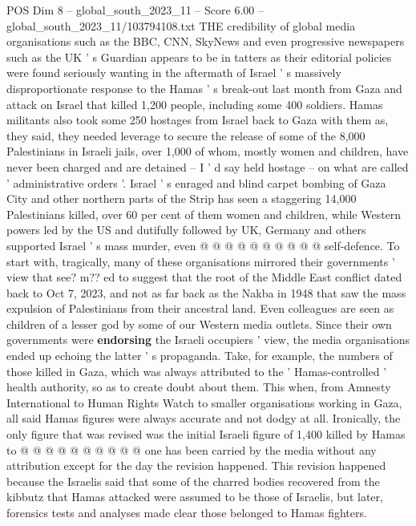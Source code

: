 \begin{textsample}{POS Dim 8 – global\_south\_2023\_11 – Score 6.00 – global\_south\_2023\_11/103794108.txt}  \label{ex:f8_pos_278}
THE credibility of global media organisations such as the BBC, CNN, SkyNews and even progressive newspapers such as the UK ' s Guardian appears to be in tatters as their editorial policies were found seriously wanting in the aftermath of Israel ' s massively disproportionate response to the Hamas ' s break-out last month from Gaza and attack on Israel that killed 1,200 people, including some 400 soldiers.
Hamas militants also took some 250 hostages from Israel back to Gaza with them as, they said, they needed leverage to secure the release of some of the 8,000 Palestinians in Israeli jails, over 1,000 of whom, mostly women and children, have never been charged and are detained -- I ' d say held hostage -- on what are called ' administrative orders '.
Israel ' s enraged and blind carpet bombing of Gaza City and other northern parts of the Strip has seen a staggering 14,000 Palestinians killed, over 60 per cent of them women and children, while Western powers led by the US and dutifully followed by UK, Germany and others supported Israel ' s mass murder, even @ @ @ @ @ @ @ @ @ @ self-defence.
To start with, tragically, many of these organisations mirrored their governments ' view that see? m?? ed to suggest that the root of the Middle East conflict dated back to Oct 7, 2023, and not as far back as the Nakba in 1948 that saw the mass expulsion of Palestinians from their ancestral land.
Even colleagues are seen as children of a lesser god by some of our Western media outlets.
Since their own governments were \textbf{endorsing} the Israeli occupiers ' view, the media organisations ended up echoing the latter ' s propaganda.
Take, for example, the numbers of those killed in Gaza, which was always attributed to the ' Hamas-controlled ' health authority, so as to create doubt about them.
This when, from Amnesty International to Human Rights Watch to smaller organisations working in Gaza, all said Hamas figures were always accurate and not dodgy at all.
Ironically, the only figure that was revised was the initial Israeli figure of 1,400 killed by Hamas to @ @ @ @ @ @ @ @ @ @ one has been carried by the media without any attribution except for the day the revision happened.
This revision happened because the Israelis said that some of the charred bodies recovered from the kibbutz that Hamas attacked were assumed to be those of Israelis, but later, forensics tests and analyses made clear those belonged to Hamas fighters.

\end{textsample}
